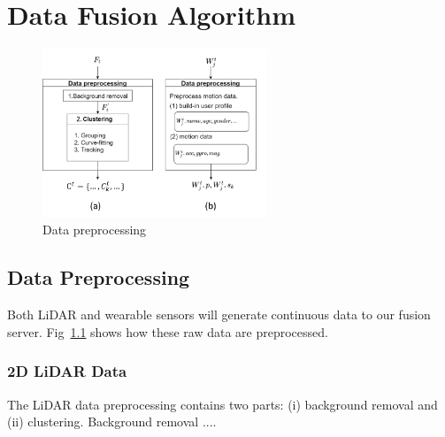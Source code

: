 \chapter{Data Fusion Algorithm}
\label{ch:method}

\begin{figure}[htb]
	\centering
	\includegraphics[width=0.6\textwidth]{img/data_preprocessing.png}
	\caption{Data preprocessing}
	\label{fig:model}
	\vspace{-10mm}
\end{figure}

\section{Data Preprocessing}
\label{sec:SMA}
Both LiDAR and wearable sensors will generate continuous data to our fusion server. Fig~\ref{fig:model} shows how these raw data are preprocessed. 


\subsection{2D LiDAR Data}
 The LiDAR data preprocessing contains two parts: (i) background removal and (ii) clustering. Background removal 
....

